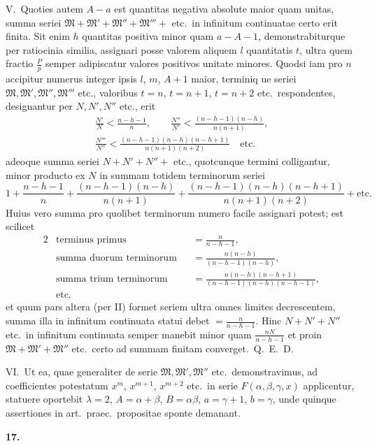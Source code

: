 \documentclass[12pt,a4paper]{article}
\newcommand{\art}[1]{\par\medskip\noindent\textbf{#1.}\par\nopagebreak\smallskip}
\begin{document}
V.\ Quoties autem $A-a$ est quantitas negativa absolute maior quam unitas, summa seriei $\mathfrak{M}+\mathfrak{M}'+\mathfrak{M}''+\mathfrak{M}'''+$ etc.\ in infinitum continuatae certo erit finita. Sit enim $h$ quantitas positiva minor quam $a-A-1$, demonstrabiturque per ratiocinia similia, assignari posse valorem aliquem $l$ quantitatis $t$, ultra quem fractio $\frac{P}{p}$ semper adipiscatur valores positivos unitate minores. Quodsi iam pro $n$ accipitur numerus integer ipsis $l$, $m$, $A+1$ maior, terminiq ue seriei $\mathfrak{M}, \mathfrak{M}', \mathfrak{M}'', \mathfrak{M}'''$ etc., valoribus $t=n$, $t=n+1$, $t=n+2$ etc.\ respondentes, designantur per $N, N', N''$ etc., erit
\begin{gather*}
\frac{N'}{N} < \frac{n-h-1}{n},\qquad
\frac{N''}{N'} < \frac{(n-h-1)(n-h)}{n(n+1)},\\
\frac{N'''}{N''} < \frac{(n-h-1)(n-h)(n-h+1)}{n(n+1)(n+2)} \quad \text{etc.}
\end{gather*}
adeoque summa seriei $N+N'+N''+$ etc., quotcunque termini colligantur, minor producto ex $N$ in summam totidem terminorum seriei
\[
1 + \frac{n-h-1}{n} + \frac{(n-h-1)(n-h)}{n(n+1)} + \frac{(n-h-1)(n-h)(n-h+1)}{n(n+1)(n+2)} + \text{etc.}
\]
Huius vero summa pro quolibet terminorum numero facile assignari potest; est scilicet
\begin{alignat*}{2}
&\text{terminus primus} &&= \tfrac{n}{n-h-1},\\
&\text{summa duorum terminorum} &&= \tfrac{n(n-h)}{(n-h-1)(n-h)},\\
&\text{summa trium terminorum} &&= \tfrac{n(n-h)(n-h+1)}{(n-h-1)(n-h)(n-h-1)},\\
&\text{etc.}
\end{alignat*}
et quum pars altera (per II) formet seriem ultra omnes limites decrescentem, summa illa in infinitum continuata statui debet $=\frac{n}{n-h-1}$. Hinc $N+N'+N''$ etc.\ in infinitum continuata semper manebit minor quam $\frac{nN}{n-h-1}$ et proin $\mathfrak{M}+\mathfrak{M}'+\mathfrak{M}''$ etc.\ certo ad summam finitam converget.\ Q.\ E.\ D.

VI.\ Ut ea, quae generaliter de serie $\mathfrak{M}, \mathfrak{M}', \mathfrak{M}''$ etc.\ demonstravimus, ad coefficientes potestatum $x^m$, $x^{m+1}$, $x^{m+2}$ etc.\ in serie $F(\alpha,\beta,\gamma,x)$ applicentur, statuere oportebit $\lambda=2$, $A=\alpha+\beta$, $B=\alpha\beta$, $a=\gamma+1$, $b=\gamma$, unde quinque assertiones in art.\ praec.\ propositae sponte demanant.

\art{17}
\end{document}
